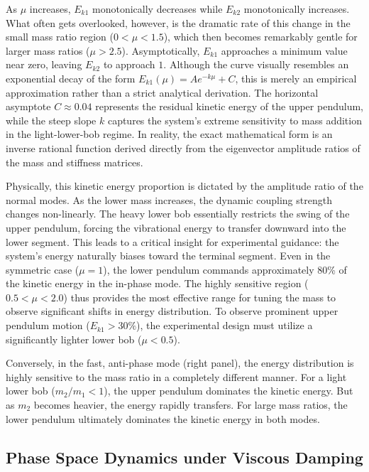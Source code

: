 \documentclass[12pt, a4paper, twoside]{article}
\begin{document}
As $\mu$ increases, $E_{k1}$ monotonically decreases while $E_{k2}$ monotonically increases. What often gets overlooked, however, is the dramatic rate of this change in the small mass ratio region ($0 < \mu < 1.5$), which then becomes remarkably gentle for larger mass ratios ($\mu > 2.5$). Asymptotically, $E_{k1}$ approaches a minimum value near zero, leaving $E_{k2}$ to approach $1$. Although the curve visually resembles an exponential decay of the form $E_{k1}(\mu) = A e^{-k\mu} + C$, this is merely an empirical approximation rather than a strict analytical derivation. The horizontal asymptote $C \approx 0.04$ represents the residual kinetic energy of the upper pendulum, while the steep slope $k$ captures the system's extreme sensitivity to mass addition in the light-lower-bob regime. In reality, the exact mathematical form is an inverse rational function derived directly from the eigenvector amplitude ratios of the mass and stiffness matrices.

Physically, this kinetic energy proportion is dictated by the amplitude ratio of the normal modes. As the lower mass increases, the dynamic coupling strength changes non-linearly. The heavy lower bob essentially restricts the swing of the upper pendulum, forcing the vibrational energy to transfer downward into the lower segment. This leads to a critical insight for experimental guidance: the system's energy naturally biases toward the terminal segment. Even in the symmetric case ($\mu = 1$), the lower pendulum commands approximately 80\% of the kinetic energy in the in-phase mode. The highly sensitive region ($0.5 < \mu < 2.0$) thus provides the most effective range for tuning the mass to observe significant shifts in energy distribution. To observe prominent upper pendulum motion ($E_{k1} > 30\%$), the experimental design must utilize a significantly lighter lower bob ($\mu < 0.5$).

Conversely, in the fast, anti-phase mode (right panel), the energy distribution is highly sensitive to the mass ratio in a completely different manner. For a light lower bob ($m_2/m_1 < 1$), the upper pendulum dominates the kinetic energy. But as $m_2$ becomes heavier, the energy rapidly transfers. For large mass ratios, the lower pendulum ultimately dominates the kinetic energy in both modes.

\clearpage

\subsection{Phase Space Dynamics under Viscous Damping}
\end{document}
